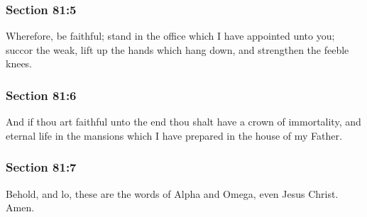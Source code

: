 	\subsubsection{Section 81:5} %
		\label{DC81-5}

		Wherefore, be faithful; stand in the office which I have appointed unto you; succor the weak, lift up the hands which hang down, and strengthen the feeble knees.


	\subsubsection{Section 81:6} %
		\label{DC81-6}

		And if thou art faithful unto the end thou shalt have a crown of immortality, and eternal life in the mansions which I have prepared in the house of my Father.


	\subsubsection{Section 81:7} %
		\label{DC81-7}

		Behold, and lo, these are the words of Alpha and Omega, even Jesus Christ.  Amen.

